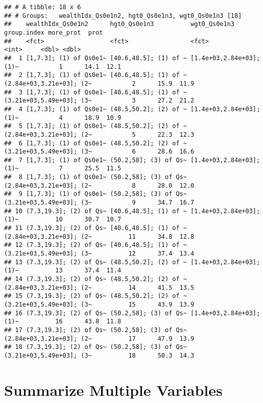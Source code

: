 \documentclass[
]{book}
\begin{document}
\begin{verbatim}
## # A tibble: 18 x 6
## # Groups:   wealthIdx_Qs0e1n2, hgt0_Qs0e1n3, wgt0_Qs0e1n3 [18]
##    wealthIdx_Qs0e1n2      hgt0_Qs0e1n3          wgt0_Qs0e1n3             group.index more_prot  prot
##    <fct>                  <fct>                 <fct>                          <int>     <dbl> <dbl>
##  1 [1,7.3]; (1) of Qs0e1~ [40.6,48.5]; (1) of ~ [1.4e+03,2.84e+03]; (1)~           1      14.1  12.1
##  2 [1,7.3]; (1) of Qs0e1~ [40.6,48.5]; (1) of ~ (2.84e+03,3.21e+03]; (2~           2      15.9  11.9
##  3 [1,7.3]; (1) of Qs0e1~ [40.6,48.5]; (1) of ~ (3.21e+03,5.49e+03]; (3~           3      27.2  21.2
##  4 [1,7.3]; (1) of Qs0e1~ (48.5,50.2]; (2) of ~ [1.4e+03,2.84e+03]; (1)~           4      18.9  10.9
##  5 [1,7.3]; (1) of Qs0e1~ (48.5,50.2]; (2) of ~ (2.84e+03,3.21e+03]; (2~           5      22.3  12.3
##  6 [1,7.3]; (1) of Qs0e1~ (48.5,50.2]; (2) of ~ (3.21e+03,5.49e+03]; (3~           6      28.6  16.6
##  7 [1,7.3]; (1) of Qs0e1~ (50.2,58]; (3) of Qs~ [1.4e+03,2.84e+03]; (1)~           7      25.5  11.5
##  8 [1,7.3]; (1) of Qs0e1~ (50.2,58]; (3) of Qs~ (2.84e+03,3.21e+03]; (2~           8      28.0  12.0
##  9 [1,7.3]; (1) of Qs0e1~ (50.2,58]; (3) of Qs~ (3.21e+03,5.49e+03]; (3~           9      34.7  16.7
## 10 (7.3,19.3]; (2) of Qs~ [40.6,48.5]; (1) of ~ [1.4e+03,2.84e+03]; (1)~          10      30.7  10.7
## 11 (7.3,19.3]; (2) of Qs~ [40.6,48.5]; (1) of ~ (2.84e+03,3.21e+03]; (2~          11      34.8  12.8
## 12 (7.3,19.3]; (2) of Qs~ [40.6,48.5]; (1) of ~ (3.21e+03,5.49e+03]; (3~          12      37.4  13.4
## 13 (7.3,19.3]; (2) of Qs~ (48.5,50.2]; (2) of ~ [1.4e+03,2.84e+03]; (1)~          13      37.4  11.4
## 14 (7.3,19.3]; (2) of Qs~ (48.5,50.2]; (2) of ~ (2.84e+03,3.21e+03]; (2~          14      41.5  13.5
## 15 (7.3,19.3]; (2) of Qs~ (48.5,50.2]; (2) of ~ (3.21e+03,5.49e+03]; (3~          15      43.9  13.9
## 16 (7.3,19.3]; (2) of Qs~ (50.2,58]; (3) of Qs~ [1.4e+03,2.84e+03]; (1)~          16      43.8  11.8
## 17 (7.3,19.3]; (2) of Qs~ (50.2,58]; (3) of Qs~ (2.84e+03,3.21e+03]; (2~          17      47.9  13.9
## 18 (7.3,19.3]; (2) of Qs~ (50.2,58]; (3) of Qs~ (3.21e+03,5.49e+03]; (3~          18      50.3  14.3
\end{verbatim}

\hypertarget{summarize-multiple-variables}{%
\section{Summarize Multiple Variables}\label{summarize-multiple-variables}}
\end{document}
